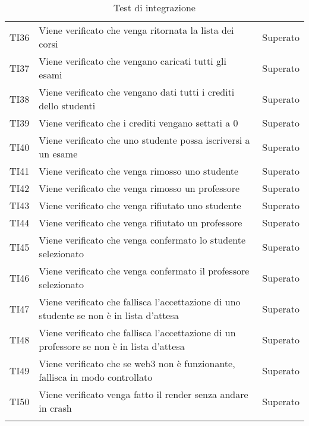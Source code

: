 \documentclass[PianoDiQualifica.tex]{subfiles}
\begin{document}
\begin{longtable}[H]{P{2cm}P{8.5cm}P{3cm}}
	TI36 & Viene verificato che venga ritornata la lista dei corsi & Superato \\
	TI37 & Viene verificato che vengano caricati tutti gli esami & Superato \\
	TI38 & Viene verificato che vengano dati tutti i crediti dello studenti & Superato \\
	TI39 & Viene verificato che i crediti vengano settati a 0 & Superato \\
	TI40 & Viene verificato che uno studente possa iscriversi a un esame & Superato \\
	TI41 & Viene verificato che venga rimosso uno studente & Superato \\
	TI42 & Viene verificato che venga rimosso un professore & Superato \\
	TI43 & Viene verificato che venga rifiutato uno studente & Superato \\
	TI44 & Viene verificato che venga rifiutato un professore & Superato \\
	TI45 & Viene verificato che venga confermato lo studente selezionato & Superato \\
	TI46 & Viene verificato che venga confermato il professore selezionato & Superato \\
	TI47 & Viene verificato che fallisca l'accettazione di uno studente se non è in lista d'attesa & Superato \\
	TI48 & Viene verificato che fallisca l'accettazione di un professore se non è in lista d'attesa & Superato \\ 
	TI49 & Viene verificato che se web3 non è funzionante, fallisca in modo controllato & Superato \\
	TI50 & Viene verificato venga fatto il render senza andare in crash & Superato \\
	\hiderowcolors
	\caption{Test di integrazione}
\end{longtable}
\end{document}
